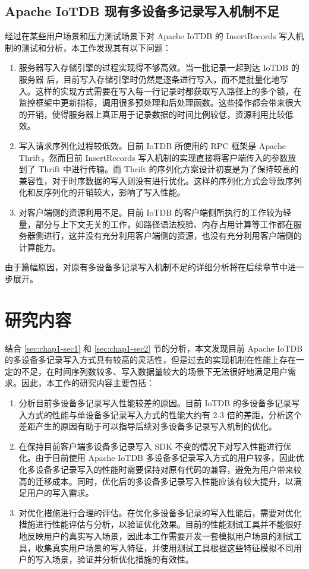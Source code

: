 \subsection{Apache IoTDB 现有多设备多记录写入机制不足}
经过在某些用户场景和压力测试场景下对 Apache IoTDB 的 InsertRecords 写入机制的测试和分析，本工作发现其有以下问题：
\begin{enumerate}
  \item 服务器写入存储引擎的过程实现得不够高效。当一批记录一起到达 IoTDB 的服务器 后，目前写入存储引擎时仍然是逐条进行写入，而不是批量化地写入。这样的实现方式需要在写入每一行记录时都获取写入路径上的多个锁，在监控框架中更新指标，调用很多预处理和后处理函数。这些操作都会带来很大的开销，使得服务器上真正用于记录数据的时间比例较低，资源利用比较低效。
  \item 写入请求序列化过程较低效。目前 IoTDB 所使用的 RPC 框架是 Apache Thrift，然而目前 InsertRecords 写入机制的实现直接将客户端传入的参数放到了 Thrift 中进行传输。而 Thrift 的序列化方案设计初衷是为了保持较高的兼容性，对于时序数据的写入则没有进行优化。这样的序列化方式会导致序列化和反序列化的开销较大，影响了写入性能。
  \item 对客户端侧的资源利用不足。目前 IoTDB 的客户端侧所执行的工作较为轻量，部分与上下文无关的工作，如路径语法校验、内存占用计算等工作都在服务器侧进行，这并没有充分利用客户端侧的资源，也没有充分利用客户端侧的计算能力。
\end{enumerate}
由于篇幅原因，对原有多设备多记录写入机制不足的详细分析将在后续章节中进一步展开。
\section{研究内容}
结合 \ref{sec:chap1-sec1} 和 \ref{sec:chap1-sec2} 节的分析，本文发现目前 Apache IoTDB 的多设备多记录写入方式具有较高的灵活性，但是过去的实现机制在性能上存在一定的不足，在时间序列数较多、写入数据量较大的场景下无法很好地满足用户需求。因此，本工作的研究内容主要包括：
\begin{enumerate}
  \item 分析目前多设备多记录写入性能较差的原因。目前 IoTDB 的多设备多记录写入方式的性能与单设备多记录写入方式的性能大约有 2-3 倍的差距，分析这个差距产生的原因有助于可以指导后续对多设备多记录写入机制的优化。
  \item 在保持目前客户端多设备多记录写入 SDK 不变的情况下对写入性能进行优化。由于目前使用 Apache IoTDB 多设备多记录写入方式的用户较多，因此优化多设备多记录写入的性能时需要保持对原有代码的兼容，避免为用户带来较高的迁移成本。同时，优化后的多设备多记录写入性能应该有较大提升，以满足用户的写入需求。
  \item 对优化措施进行合理的评估。在优化多设备多记录的写入性能后，需要对优化措施进行性能评估与分析，以验证优化效果。目前的性能测试工具并不能很好地反映用户的真实写入场景，因此本工作需要开发一套模拟用户场景的测试工具，收集真实用户场景的写入特征，并使用测试工具根据这些特征模拟不同用户的写入场景，验证并分析优化措施的有效性。
\end{enumerate}

